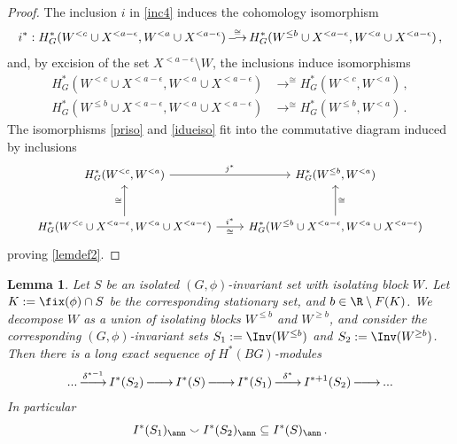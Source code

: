 \documentclass[11pt,a4paper,reqno]{article}
\DeclareMathOperator*{\toup}{\longrightarrow}
\DeclareMathOperator*{\ttoup}{\llongrightarrow}
\DeclareRobustCommand{\llongrightarrow}{\relbar\joinrel\relbar\joinrel\rightarrow}
\numberwithin{equation}{section}
\newtheorem{lemma}[theorem]{Lemma}
\theoremstyle{definition}
\begin{document}
\begin{proof}
The inclusion $i$ 
in \eqref{inc4} 
induces the cohomology isomorphism
\begin{equation}\label{priso}\small
i^*:H_G^*(W^{<c}\cup X^{<a-\epsilon},W^{<a}\cup X^{<a-\epsilon})\toup^{\cong}H_G^*(W^{\leq b}\cup X^{<a-\epsilon},W^{<a}\cup X^{<a-\epsilon}) \, ,
\end{equation}
and, by excision of the set $ X^{<a-\epsilon} \setminus  W $, the inclusions induce isomorphisms
\begin{equation}
\label{idueiso}
\begin{aligned}
H_G^*(W^{<c}\cup X^{<a-\epsilon},W^{<a}\cup X^{<a-\epsilon})
&\toup^{\cong}
H^*_G(W^{<c},W^{<a}) \, ,
\\
H_G^*(W^{\leq b}\cup X^{<a-\epsilon},W^{<a}\cup X^{<a-\epsilon})
&\toup^{\cong}
H^*_G(W^{\leq b},W^{<a}) \, .
\end{aligned}
\end{equation}
The isomorphisms \eqref{priso}
and \eqref{idueiso} fit into the commutative diagram induced by inclusions
\begin{equation*}\small
\begin{tikzcd}[row sep=large, column sep=small]
H^*_G(W^{<c},W^{<a})
\arrow[rr,"j^*"] 
& &
H^*_G(W^{\leq b},W^{<a})
\\
H_G^*(W^{<c}\cup X^{<a-\epsilon},W^{<a}\cup X^{<a-\epsilon})
\arrow[rr,"i^*","\cong"'] 
\arrow[u,"\cong"] 
&&
H_G^*(W^{\leq b}\cup X^{<a-\epsilon},W^{<a}\cup X^{<a-\epsilon})
\arrow[u,"\cong"']
\end{tikzcd}
\end{equation*}
proving \eqref{lemdef2}.
\end{proof}


\begin{lemma}\label{l:long_exact_sequence_local_cohomology}
Let $S$ be an isolated $(G,\phi)$-invariant set with isolating block $W$. Let $K:=\fix(\phi)\cap S$ be the corresponding stationary set, and $b\in\R\setminus F(K)$. We decompose $W$ as a union of isolating blocks $W^{\leq b}$ and $W^{\geq b}$, and  consider the corresponding $(G,\phi)$-invariant sets 
$ S_1:=\Inv(W^{\leq b}) $ and 
$ S_2:=\Inv(W^{\geq b}) $.   
Then there is a long exact sequence of $H^*(BG)$-modules
\begin{align}
\label{e:les_local_cohomology}
...
\ttoup^{\delta^{*-1}}
I^*(S_2)
\ttoup
I^*(S)
\ttoup
I^*(S_1)
\ttoup^{\delta^{*}}
I^{*+1}(S_2)
\ttoup
...
\end{align}
In particular
\begin{equation}\label{incann12}
    I^*(S_1)_\ann \smallsmile I^*(S_2)_\ann \subseteq I^*(S)_\ann \, .
\end{equation}
\end{lemma}
\end{document}

